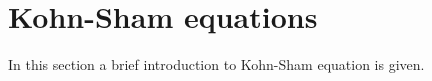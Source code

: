 \section{Kohn-Sham equations}

In this section a brief introduction to Kohn-Sham equation is given.


